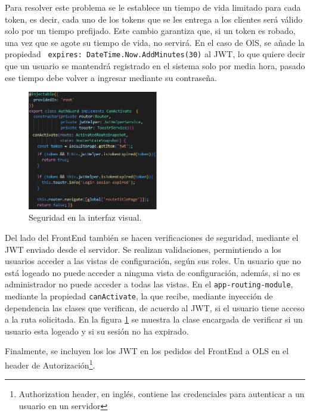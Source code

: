 Para resolver este problema se le establece un tiempo de vida limitado para cada token, es decir, cada uno de los tokens que se les entrega a los clientes ser\'a v\'alido solo por un tiempo prefijado. Este cambio garantiza que, si un token es robado, una vez que se agote su tiempo de vida, no servir\'a. En el caso de OlS, se a\~nade la propiedad \texttt{ expires: DateTime.Now.AddMinutes(30)} al JWT, lo que quiere decir que un usuario se mantendr\'a registrado en el sistema solo por media hora, pasado ese tiempo debe volver a ingresar mediante su contrase\~na.

\begin{figure}
\vspace{-20pt}
\begin{center}
\includegraphics[width=0.52\textwidth]{images/authAngular.png} 
\end{center} \vspace{-20pt} \caption{Seguridad en la interfaz visual.}  \label{auth} \vspace{-10pt} 
\end{figure}

Del lado del FrontEnd tambi\'en se hacen verificaciones de seguridad, mediante el JWT enviado desde el servidor. Se realizan validaciones, permintiendo a los usuarios acceder a las  vistas de configuraci\'on, seg\'un sus roles. Un usuario que no est\'a logeado no puede acceder a ninguna vista de configuraci\'on, adem\'as, si no es administrador no puede acceder a todas las vistas. En el \texttt{app-routing-module}, mediante la propiedad \texttt{canActivate}, la que recibe, mediante inyecci\'on de dependencia las clases que verifican, de acuerdo al JWT, si el usuario tiene acceso a la ruta solicitada. En la figura \ref{auth} se muestra la clase encargada de verificar si un usuario esta logeado y si su sesi\'on no ha expirado.

Finalmente, se incluyen los los JWT en los pedidos del FrontEnd a OLS en el header de Autorizaci\'on\footnote{Authorization header, en ingl\'es, contiene las credenciales para autenticar a un usuario en un servidor}.

